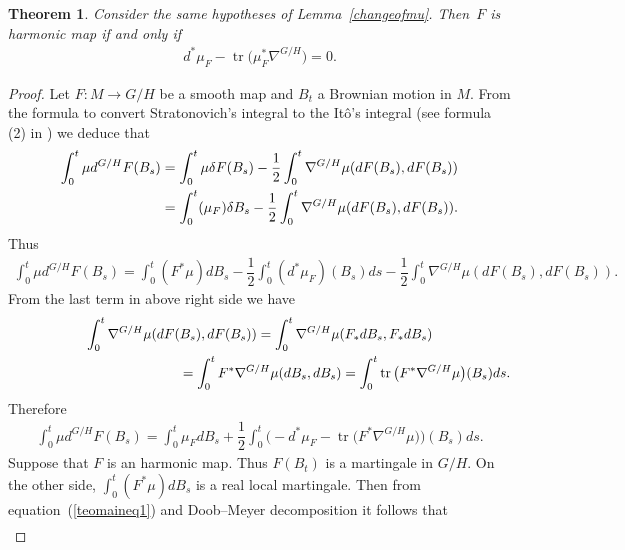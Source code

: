 \documentclass[10pt,a4paper]{amsart}
\numberwithin{equation}{section}
\newtheorem{Theorem}{Theorem}[section]
\begin{document}
\begin{Theorem}\label{mainteo}
  Consider the same hypotheses of Lemma~{\rm \ref{changeofmu}}. Then~$F$ is harmonic map if and only if
  \begin{gather*}%
    d^{*}\mu_{F}  - \operatorname{tr}\big(\mu_{F}^* \nabla^{G/H}\big) = 0.
  \end{gather*}
\end{Theorem}



\begin{proof}
  Let $F\colon M \rightarrow G/H$ be a smooth map and $B_{t}$ a Brownian motion in $M$. From the formula to convert Stratonovich's integral to the It\^o's integral (see formula (2) in \cite{Stelmastchuk}) we deduce that
  \begin{gather*}
    \int_0^t \mu d^{G/H}F(B_{s})
      =  \int_0^t \mu \delta F(B_{s}) -\dfrac{1}{2} \int_0^t \nabla^{G/H}\mu(dF(B_s),dF(B_s))\\
\hphantom{\int_0^t \mu d^{G/H}F(B_{s})}{}  =  \int_0^t (\mu_{F}) \delta B_{s} - \dfrac{1}{2}\int_0^t \nabla^{G/H}\mu(dF(B_s),dF(B_s)).
  \end{gather*}
  Thus
  \begin{gather*}
    \int_0^t  \mu d^{G/H}F(B_{s})  =  \int_0^t  (F^{*}\mu) dB_{s}  -  \dfrac{1}{2}\int_0^t
    (d^{*}\mu_{F})(B_{s})ds - \dfrac{1}{2} \int_0^t  \nabla^{G/H}\mu(dF(B_s),dF(B_s)).
  \end{gather*}
  From the last term in above right side we have
  \begin{gather*}
    \int_0^t \nabla^{G/H}\mu(dF(B_s),dF(B_s))   =   \int_0^t \nabla^{G/H}\mu(F_{*}dB_s,F_{*}dB_s)\\
\hphantom{\int_0^t \nabla^{G/H}\mu(dF(B_s),dF(B_s))}{}
 =   \int_0^t  F^{*} \nabla^{G/H}\mu(dB_s,dB_s)   =  \int_0^t  \operatorname{tr}\big(F^{*}
    \nabla^{G/H}\mu\big)(B_{s})ds .
  \end{gather*}
  Therefore
  \begin{gather}\label{teomaineq1}
    \int_0^t \mu d^{G/H}F(B_{s}) = \int_0^t \mu_{F} dB_{s} + \dfrac{1}{2}\int_0^t\big({-}d^{*}\mu_{F} - \operatorname{tr}\big(F^{*} \nabla^{G/H}\mu\big)\big)(B_{s}) ds.
  \end{gather}
  Suppose that $F$ is an harmonic map. Thus $F(B_{t})$ is a martingale in $G/H$. On the other side, $\int_0^t (F^{*}\mu) dB_{s}$ is a real local martingale. Then from equation~(\ref{teomaineq1}) and Doob--Meyer decomposition it follows that
  \begin{gather*}%

\end{gather*}
\end{proof}
\end{document}
